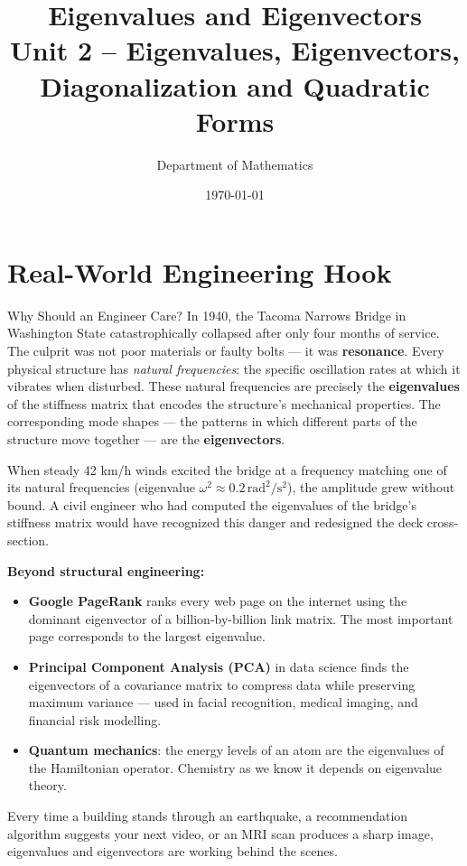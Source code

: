 \documentclass[12pt,a4paper]{article}
\title{\textbf{Eigenvalues and Eigenvectors} \\ \large Unit 2 -- Eigenvalues, Eigenvectors, Diagonalization and Quadratic Forms}
\author{Department of Mathematics}
\date{\today}
\begin{document}
\maketitle
\tableofcontents
\newpage

\section{Real-World Engineering Hook}

\begin{curiositybox}{Why Should an Engineer Care?}
In 1940, the Tacoma Narrows Bridge in Washington State catastrophically collapsed after only four months of service.
The culprit was not poor materials or faulty bolts --- it was \textbf{resonance}.
Every physical structure has \emph{natural frequencies}: the specific oscillation rates at which it vibrates
when disturbed. These natural frequencies are precisely the \textbf{eigenvalues} of the stiffness matrix
that encodes the structure's mechanical properties. The corresponding mode shapes --- the patterns in
which different parts of the structure move together --- are the \textbf{eigenvectors}.

When steady 42 km/h winds excited the bridge at a frequency matching one of its natural frequencies
(eigenvalue $\omega^2 \approx 0.2\,\text{rad}^2/\text{s}^2$), the amplitude grew without bound.
A civil engineer who had computed the eigenvalues of the bridge's stiffness matrix would have recognized
this danger and redesigned the deck cross-section.

\textbf{Beyond structural engineering:}
\begin{itemize}
  \item \textbf{Google PageRank} ranks every web page on the internet using the dominant eigenvector
        of a billion-by-billion link matrix. The most important page corresponds to the largest eigenvalue.
  \item \textbf{Principal Component Analysis (PCA)} in data science finds the eigenvectors of a
        covariance matrix to compress data while preserving maximum variance --- used in facial recognition,
        medical imaging, and financial risk modelling.
  \item \textbf{Quantum mechanics}: the energy levels of an atom are the eigenvalues of the Hamiltonian
        operator. Chemistry as we know it depends on eigenvalue theory.
\end{itemize}

Every time a building stands through an earthquake, a recommendation algorithm suggests your next video,
or an MRI scan produces a sharp image, eigenvalues and eigenvectors are working behind the scenes.
\end{curiositybox}
\end{document}
